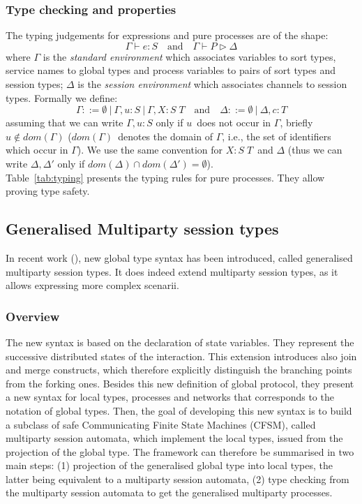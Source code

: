 \documentclass[a4paper,11pt,twoside]{report}
\newcommand{\ptilde}[1]{{\ensuremath{#1}}}
\newcommand{\uu}{\ensuremath{u}}
\newcommand{\PP}{\ensuremath{P}}
\newcommand{\cc}{\ensuremath{c}}
\newcommand{\e}{\ensuremath{e}}
\newcommand{\X}{\ensuremath{X}}
\newcommand{\atw}[1]{\ensuremath{\ptilde{#1}}}
\newcommand{\sep}{\ensuremath{~\mathbf{|}~ }}
\newcommand{\Ga}{\ensuremath{\Gamma}}
\newcommand{\D}{\ensuremath{\Delta}}
\newcommand{\T}{\ensuremath{T}}
\newcommand{\TT}{\atw{\T}}
\newcommand{\SST}{\atw{S}}
\newcommand{\der}[3]{\ensuremath{#1\vdash#2\triangleright#3}}
\newcommand{\dom}[1]{\ensuremath{dom( #1)}}
\newcommand{\Xtype}{\ensuremath{\X : \SST\;\TT}}
\begin{document}
\subsubsection{Type checking and properties}
The typing judgements for expressions and pure processes are of the shape:
\[
\Gamma\vdash \e :S\quad \text{and}\quad \der \Ga {\PP}\D
\]
where $\Ga$ is the {\em standard environment} which associates variables to sort types, service names to global types and process variables to pairs of sort types and session types; $\D$ is the {\em session environment} which associates channels to session types.
Formally we define:
\[
\Ga::=\emptyset\sep\Ga,\uu:S\sep\Ga,
\Xtype\quad \text{and} \quad \D::=\emptyset\sep\D,\cc:T
\]
assuming that we can write $\Ga,\uu:S$ only if \uu\ does not occur in \Ga, briefly $\uu\not\in\dom\Ga$ (\dom\Ga\ denotes the domain of \Ga, i.e., the set of identifiers which occur in \Ga). We use the same convention for \Xtype\ and \D{} (thus we can write $\D, \D'$ only if $\dom\D\cap\dom{\D'}=\emptyset$).\\
Table~\ref{tab:typing} presents the typing rules for pure processes. They allow proving type safety.



\subsection{Generalised Multiparty session types}
In recent work (\cite{denielou2012multiparty}), new global type syntax has been introduced, called generalised multiparty session types. It does indeed extend multiparty session types, as it allows expressing more complex scenarii. 

\subsubsection{Overview}
The new syntax is based on the declaration of state variables. They represent the successive distributed states of the interaction. This extension introduces also join and merge constructs, which therefore explicitly distinguish the branching points from the forking ones. Besides this new definition of global protocol, they present a new syntax for local types, processes and networks that corresponds to the notation of global types. Then, the goal of developing this new syntax is to build a subclass of safe Communicating Finite State Machines (CFSM), called multiparty session automata, which implement the local types, issued from the projection of the global type. The framework can therefore be summarised in two main steps: (1) projection of the generalised global type into local types, the latter being equivalent to a multiparty session automata, (2) type checking from the multiparty session automata to get the generalised multiparty processes.
\end{document}
